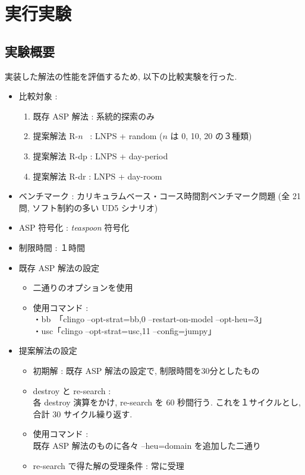 \chapter{実行実験}

\section{実験概要}
実装した解法の性能を評価するため, 以下の比較実験を行った.

\begin{itemize}
 \item 比較対象 :
  \begin {enumerate}
   \item \small 既存 ASP 解法 : 系統的探索のみ
   \item 提案解法 R-$n$~ : LNPS + random ($n$ は 0, 10, 20 の３種類) 
   \item 提案解法 R-dp : LNPS + day-period
   \item 提案解法 R-dr : LNPS + day-room
  \end{enumerate}
 \item ベンチマーク : カリキュラムベース・コース時間割ベンチマーク問題 (全 21 問, ソフト制約の多い UD5 シナリオ)
 \item ASP 符号化 : \textit{teaspoon} 符号化
 \cite{%
 banbara17:ramp} 
 \item 制限時間 : １時間
 
 \item 既存 ASP 解法の設定
  \begin{itemize}
   \item \small 二通りのオプションを使用
   \item 使用コマンド :\\
   ・bb~「clingo --opt-strat=bb,0 --restart-on-model --opt-heu=3」\\   
   ・usc「clingo --opt-strat=usc,11 --config=jumpy」
  \end{itemize}
  
 \item 提案解法の設定
  \begin{itemize}
   \item \small 初期解 : 既存 ASP 解法の設定で, 制限時間を30分としたもの
   \item destroy と re-search :\\
   各 destroy 演算をかけ, re-search を 60 秒間行う. これを１サイクルとし, 合計 30 サイクル繰り返す.
   \item 使用コマンド :\\
   既存 ASP 解法のものに各々 --heu=domain を追加した二通り
   \item re-search で得た解の受理条件 : 常に受理
  \end{itemize}
  
\end{itemize}
\newpage

